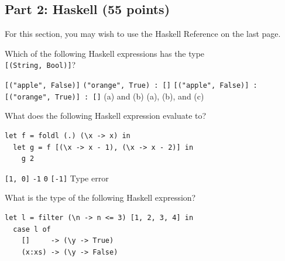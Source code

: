 \documentclass[addpoints]{exam}
\begin{document}
\begin{questions}

\newpage
  
\subsection*{\textbf{Part 2: Haskell (55 points)}}

For this section, you may wish to use the Haskell Reference on the last page.

\question[5] Which of the following Haskell expressions has the type \\ \texttt{[(String, Bool)]}?

\begin{choices}
  \choice \texttt{[("apple", False)]}
  \choice \texttt{("orange", True) : []}
  \choice \texttt{[("apple", False)] : [("orange", True)] : []}
  \CorrectChoice (a) and (b)
  \choice (a), (b), and (c)
\end{choices}

\question[5] What does the following Haskell expression evaluate to?
\begin{verbatim}
let f = foldl (.) (\x -> x) in
  let g = f [(\x -> x - 1), (\x -> x - 2)] in
    g 2
\end{verbatim}

\begin{choices}
  \choice \texttt{[1, 0]}
  \CorrectChoice \texttt{-1}
  \choice \texttt{0}
  \choice \texttt{[-1]}
  \choice Type error
\end{choices}

\question[5] What is the type of the following Haskell expression?
\begin{verbatim}
let l = filter (\n -> n <= 3) [1, 2, 3, 4] in
  case l of
    []     -> (\y -> True)
    (x:xs) -> (\y -> False)
\end{verbatim}


\end{questions}
\end{document}
